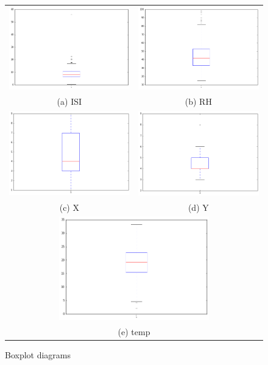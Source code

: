 \begin{figure}
\begin{tabular}{cc}
 \includegraphics[width=65mm]{images/boxplots/ISI.png} &   \includegraphics[width=65mm]{images/boxplots/RH.png} \\
(a) ISI & (b) RH \\[6pt]
  \includegraphics[width=65mm]{images/boxplots/x.png} &   \includegraphics[width=65mm]{images/boxplots/y.png} \\
(c) X & (d) Y \\[6pt]
\multicolumn{2}{c}{\includegraphics[width=65mm]{images/boxplots/temp.png} }\\
\multicolumn{2}{c}{(e) temp}
\end{tabular}
\caption{Boxplot diagrams}
\end{figure}